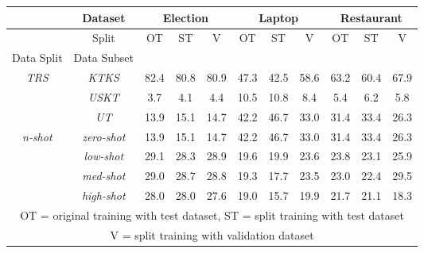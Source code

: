 \begin{tabular}{|c|c|c|c|c|c|c|c|c|c|c|}
\hline
& Dataset & \multicolumn{3}{c|}{Election} & \multicolumn{3}{c|}{Laptop} & \multicolumn{3}{c|}{Restaurant} \\    
\hline
& Split &       OT &    ST &     V &     OT &    ST &     V &         OT &    ST &     V \\
\hline
Data Split & Data Subset &          &       &       &        &       &       &            &       &       \\
\hline
\multirow{3}{*}{\textit{TRS}} & \textit{KTKS} &     82.4 &  80.8 &  80.9 &   47.3 &  42.5 &  58.6 &       63.2 &  60.4 &  67.9 \\
& \textit{USKT} &      3.7 &   4.1 &   4.4 &   10.5 &  10.8 &   8.4 &        5.4 &   6.2 &   5.8 \\
& \textit{UT} &     13.9 &  15.1 &  14.7 &   42.2 &  46.7 &  33.0 &       31.4 &  33.4 &  26.3 \\
\hline
\multirow{3}{*}{\textit{n-shot}} & \textit{zero-shot} &     13.9 &  15.1 &  14.7 &   42.2 &  46.7 &  33.0 & 31.4 &  33.4 &  26.3 \\
& \textit{low-shot} &     29.1 &  28.3 &  28.9 &   19.6 &  19.9 &  23.6 &       23.8 &  23.1 &  25.9 \\
& \textit{med-shot} &     29.0 &  28.7 &  28.8 &   19.3 &  17.7 &  23.5 &       23.0 &  22.4 &  29.5 \\
& \textit{high-shot} &     28.0 &  28.0 &  27.6 &   19.0 &  15.7 &  19.9 &       21.7 &  21.1 &  18.3 \\
\hline
\multicolumn{11}{|c|}{OT = original training with test dataset, ST = split training with test dataset} \\
\multicolumn{11}{|c|}{V = split training with validation dataset} \\
\hline
\end{tabular}